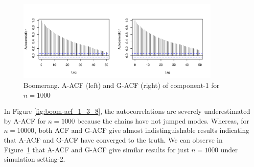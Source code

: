 \documentclass[11pt]{article}
\theoremstyle{remark}
\begin{document}
\begin{figure}[h]
    \centering
    \includegraphics[width = 0.9\textwidth ]{plots/boom-acf_1_10_7_n1000.pdf}
    \caption{Boomerang. A-ACF (left) and G-ACF (right) of component-1 for $n=1000$}
    \label{fig:boom-acf_1_10_7}
\end{figure}

 
 In Figure \ref{fig:boom-acf_1_3_8}, the autocorrelations are severely underestimated by A-ACF for $n=1000$ because the chains have not jumped modes. Whereas, for $n=10000$, both ACF and G-ACF give almost indistinguishable results indicating that A-ACF and G-ACF have converged to the truth. We can observe in Figure~\ref{fig:boom-acf_1_10_7} that A-ACF and G-ACF give similar results for just $n=1000$ under simulation setting-2.
\end{document}
